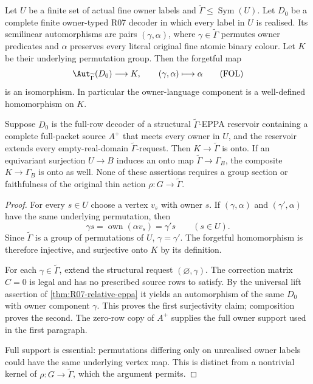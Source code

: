 \begin{lemma}
\label{lem:acf-full-owner-language-faithfulness}
Let $U$ be a finite set of actual fine owner labels and
$\widetilde\Gamma\le\operatorname{Sym}(U)$. Let $D_0$ be a
complete finite owner-typed R07 decoder in which every label
in $U$ is realised. Its semilinear automorphisms are pairs
$(\gamma,\alpha)$, where $\gamma\in\widetilde\Gamma$ permutes
owner predicates and $\alpha$ preserves every literal original
fine atomic binary colour. Let $K$ be their underlying
permutation group. Then the forgetful map
\[
 \Aut_{\widetilde\Gamma}(D_0)\longrightarrow K,
 \qquad (\gamma,\alpha)\longmapsto\alpha
\tag{FOL}\label{eq:acf-full-owner-language-faithfulness}
\]
is an isomorphism. In particular the owner-language component
is a well-defined homomorphism on $K$.

Suppose $D_0$ is the full-row decoder of a structural
$\widetilde\Gamma$-EPPA reservoir containing a complete
full-packet source $A^+$ that meets every owner in $U$, and the
reservoir extends every empty-real-domain
$\widetilde\Gamma$-request. Then $K\to\widetilde\Gamma$ is onto.
If an equivariant surjection $U\to B$ induces an onto map
$\widetilde\Gamma\to\Gamma_B$, the composite $K\to\Gamma_B$
is onto as well. None of these assertions requires a group
section or faithfulness of the original thin action
$\rho:G\to\widetilde\Gamma$.
\end{lemma}
\begin{proof}
For every $s\in U$ choose a vertex $v_s$ with owner $s$.
If $(\gamma,\alpha)$ and $(\gamma',\alpha)$ have the same
underlying permutation, then
\[
         \gamma s=\operatorname{own}(\alpha v_s)=\gamma's
                  \qquad(s\in U).
\]
Since $\widetilde\Gamma$ is a group of permutations of $U$,
$\gamma=\gamma'$. The forgetful homomorphism is therefore
injective, and surjective onto $K$ by its definition.

For each $\gamma\in\widetilde\Gamma$, extend the structural
request $(\varnothing,\gamma)$. The correction matrix $C=0$
is legal and has no prescribed source rows to satisfy.
By the universal lift assertion of \cref{thm:R07-relative-eppa}
it yields an automorphism of the same $D_0$ with owner component
$\gamma$. This proves the first surjectivity claim; composition
proves the second. The zero-row copy of $A^+$ supplies the full
owner support used in the first paragraph.

Full support is essential: permutations differing only on
unrealised owner labels could have the same underlying vertex
map. This is distinct from a nontrivial kernel of
$\rho:G\to\widetilde\Gamma$, which the argument permits.
\end{proof}
